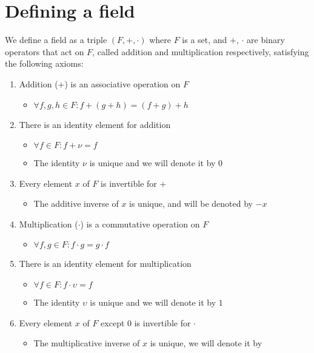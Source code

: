 \documentclass{article}
\begin{document}
\section{Defining a field}
\label{sec:Defining a field}

We define a field as a triple $(F,+,\cdot)$ where $F$ is a set, and $+$, $\cdot$
are binary operators that act on $F$, called addition and multiplication
respectively, satisfying the following axioms\cite{field}:
\begin{enumerate}
	\item Addition ($+$) is an associative operation on $F$
	      \begin{itemize}
	      	\item $\forall f,g,h \in F : f+(g+h) = (f+g)+h$
	      \end{itemize}
	\item There is an identity element for addition
	      \begin{itemize}
	      	\item $\forall f \in F: f + \nu = f$
	      	\item The identity $\nu$ is unique and we will denote it by   $0$
	      \end{itemize}
	\item Every element $x$ of $F$ is invertible for $+$
	      \begin{itemize}
	      	\item The additive inverse of $x$ is unique, and will be denoted by $-x$
	      \end{itemize}
	\item Multiplication ($\cdot$) is a commutative operation on $F$
	      \begin{itemize}
	      	\item $\forall f,g \in F : f \cdot g = g \cdot f$
	      \end{itemize}
	\item There is an identity element for multiplication
	      \begin{itemize}
	      	\item $\forall f \in F: f \cdot \upsilon = f$
	      	\item The identity $\upsilon$ is unique and we will denote it by $1$
	      \end{itemize}
	\item Every element $x$ of $F$ except $0$ is invertible for $\cdot$
	      \begin{itemize}
	      	\item The multiplicative inverse of $x$ is unique, we will denote it by

\end{itemize}
\end{enumerate}
\end{document}
